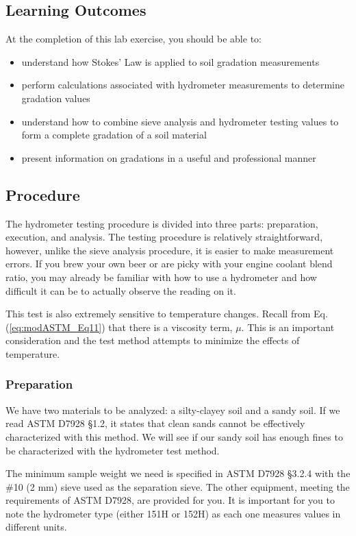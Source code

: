 \documentclass[12pt]{article}
\begin{document}
\subsection{Learning Outcomes}
At the completion of this lab exercise, you should be able to:
\begin{itemize}
    \item understand how Stokes' Law is applied to soil gradation measurements
    \item perform calculations associated with hydrometer measurements to determine gradation values
    \item understand how to combine sieve analysis and hydrometer testing values to form a complete gradation of a soil material
    \item present information on gradations in a useful and professional manner
\end{itemize}

\pagebreak
\subsection{Procedure}
The hydrometer testing procedure is divided into three parts: preparation, execution, and analysis. The testing procedure is relatively straightforward, however, unlike the sieve analysis procedure, it is easier to make measurement errors. If you brew your own beer or are picky with your engine coolant blend ratio, you may already be familiar with how to use a hydrometer and how difficult it can be to actually observe the reading on it.

This test is also extremely sensitive to temperature changes. Recall from Eq. (\ref{eq:modASTM_Eq11}) that there is a viscosity term, $\mu$. This is an important consideration and the test method attempts to minimize the effects of temperature.

\subsubsection{Preparation}
We have two materials to be analyzed: a silty-clayey soil and a sandy soil. If we read ASTM D7928 \S1.2, it states that clean sands cannot be effectively characterized with this method. We will see if our sandy soil has enough fines to be characterized with the hydrometer test method.

The minimum sample weight we need is specified in ASTM D7928 \S3.2.4 with the \#10 (2 mm) sieve used as the separation sieve. The other equipment, meeting the requirements of ASTM D7928, are provided for you. It is important for you to note the hydrometer type (either 151H or 152H) as each one measures values in different units.
\end{document}
